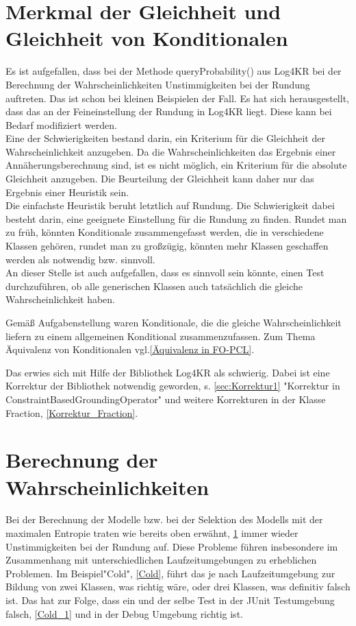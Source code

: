 \documentclass[draft]{scrreprt}
\begin{document}
{\section{Merkmal der Gleichheit und Gleichheit von Konditionalen} \label{Gleichheit}
Es ist aufgefallen, dass bei der Methode queryProbability() aus Log4KR bei der Berechnung der Wahrscheinlichkeiten Unstimmigkeiten bei der Rundung auftreten. Das ist schon bei kleinen Beispielen der Fall. Es hat sich herausgestellt, dass das an der Feineinstellung der Rundung in Log4KR liegt. Diese kann bei Bedarf modifiziert werden.\\
Eine der Schwierigkeiten bestand darin, ein Kriterium für die Gleichheit der Wahrscheinlichkeit anzugeben. Da die Wahrscheinlichkeiten das Ergebnis einer Annäherungsberechnung sind, ist es nicht möglich, ein Kriterium für die absolute Gleichheit anzugeben. Die Beurteilung der Gleichheit kann daher nur das Ergebnis einer Heuristik sein.\\
Die einfachste Heuristik beruht letztlich auf Rundung. Die Schwierigkeit dabei besteht darin, eine geeignete Einstellung für die Rundung zu finden. Rundet man zu früh, könnten Konditionale zusammengefasst werden, die in verschiedene Klassen gehören, rundet man zu großzügig, könnten mehr Klassen geschaffen werden als notwendig bzw. sinnvoll.\\
An dieser Stelle ist auch aufgefallen, dass es sinnvoll sein könnte, einen Test durchzuführen, ob alle generischen Klassen auch tatsächlich die gleiche Wahrscheinlichkeit haben. 

Gemäß Aufgabenstellung waren Konditionale, die die gleiche Wahrscheinlichkeit liefern zu einem allgemeinen Konditional zusammenzufassen. Zum Thema Äquivalenz von Konditionalen vgl.\ref{Äquivalenz in FO-PCL}.

Das erwies sich mit Hilfe der Bibliothek Log4KR als schwierig. Dabei ist eine Korrektur der Bibliothek notwendig geworden, s. \ref{sec:Korrektur1} "{}Korrektur in ConstraintBasedGroundingOperator"{} und weitere Korrekturen in der Klasse Fraction, \ref{Korrektur_Fraction}.



\section{Berechnung der Wahrscheinlichkeiten} \label{Berechnung_Wahrscheinlichkeiten}
Bei der Berechnung der Modelle bzw. bei der Selektion des Modells mit der maximalen Entropie traten wie bereits oben erwähnt, \ref{Gleichheit} immer wieder Unstimmigkeiten bei der Rundung auf. Diese Probleme führen insbesondere im Zusammenhang mit unterschiedlichen Laufzeitumgebungen zu erheblichen Problemen. Im Beispiel"{}Cold"{}, \ref{Cold}, führt das je nach Laufzeitumgebung zur Bildung von zwei Klassen, was richtig wäre, oder drei Klassen, was definitiv falsch ist. Das hat zur Folge, dass ein und der selbe Test in der JUnit Testumgebung falsch, \ref{Cold_1} und in der Debug Umgebung richtig ist.

}
\end{document}
